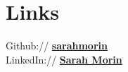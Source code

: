 \documentclass[]{deedy-resume-openfont}
\begin{document}
\begin{minipage}[t]{0.33\textwidth}




        \section{Links}
        Github:// \href{https://github.com/sarahmorin}{\bf sarahmorin}\\
        LinkedIn://  \href{https://www.linkedin.com/in/sarah-morin-500603165/}{\bf Sarah Morin} \\





\end{minipage}
\hfill
\end{document}
